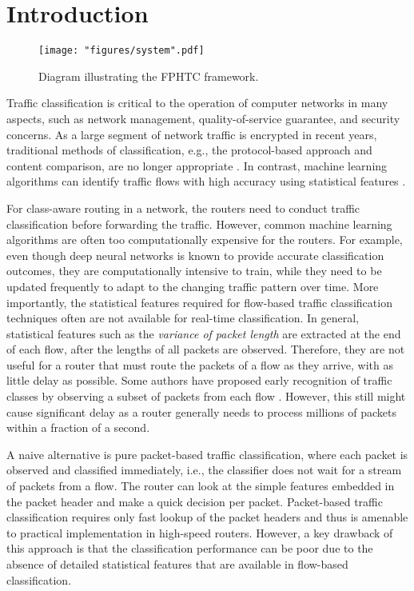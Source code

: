 
\section{Introduction}
\label{sec:intro}

\begin{figure*}[t]
	\centering
	\texttt{[image: "figures/system".pdf]}
	\caption{Diagram illustrating the FPHTC framework.}
	\label{fig:scheme}
\end{figure*}

Traffic classification is critical to the operation of computer networks in many aspects, such as network management, quality-of-service guarantee, and security concerns. As a large segment of network traffic is encrypted in recent years, traditional methods of classification, e.g., the protocol-based approach and content comparison, are no longer appropriate \cite{Finsterbusch14}. In contrast, machine learning algorithms can identify traffic flows with high accuracy using statistical features \cite{Moore05,Auld07,Duffield04,Wang16, Chowdhury19}.

For class-aware routing in a network, the routers need to conduct traffic classification before forwarding the traffic. However, common machine learning algorithms are often too computationally expensive for the routers. For example, even though deep neural networks is known to provide accurate classification outcomes, they are computationally intensive to train, while they need to be updated frequently to adapt to the changing traffic pattern over time. More importantly, the statistical features required for flow-based traffic classification techniques often are not available for real-time classification. In general, statistical features such as the \textit{variance of packet length} are extracted at the end of each flow, after the lengths of all packets are observed. Therefore, they are not useful for a router that must route the packets of a flow as they arrive, with as little delay as possible. Some authors have proposed early recognition of traffic classes by observing a subset of packets from each flow \cite{Bernaille07,Nguyen12, Xie12}. However, this still might cause significant delay as a router generally needs to process millions of packets within a fraction of a second.

A naive alternative is pure packet-based traffic classification, where each packet is observed and classified immediately, i.e., the classifier does not wait for a stream of packets from a flow. The router can look at the simple features embedded in the packet header and make a quick decision per packet. Packet-based traffic classification requires only fast lookup of the packet headers and thus is amenable to practical implementation in high-speed routers. However, a key drawback of this approach is that the classification performance can be poor due to the absence of detailed statistical features that are available in flow-based classification. 

